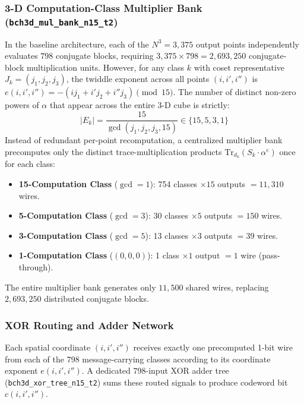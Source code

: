 \documentclass[journal]{IEEEtran}
\begin{document}
\subsubsection{3-D Computation-Class Multiplier Bank (\texttt{bch3d\_mul\_bank\_n15\_t2})}
In the baseline architecture, each of the $N^3 = 3,375$ output points independently evaluates $798$ conjugate blocks, requiring $3,375 \times 798 = 2,693,250$ conjugate-block multiplication units. However, for any class $k$ with coset representative $J_k = (j_1, j_2, j_3)$, the twiddle exponent across all points $(i, i', i'')$ is $e(i, i', i'') = -(i j_1 + i' j_2 + i'' j_3) \pmod{15}$. The number of distinct non-zero powers of $\alpha$ that appear across the entire 3-D cube is strictly:
\begin{equation}
|E_k| = \frac{15}{\gcd(j_1, j_2, j_3, 15)} \in \{15, 5, 3, 1\}
\end{equation}
Instead of redundant per-point recomputation, a centralized multiplier bank precomputes only the distinct trace-multiplication products $\mathrm{Tr}_{d_k}(S_k \cdot \alpha^e)$ once for each class:
\begin{itemize}
    \item \textbf{15-Computation Class} ($\gcd=1$): 754 classes $\times 15$ outputs $= 11,310$ wires.
    \item \textbf{5-Computation Class} ($\gcd=3$): 30 classes $\times 5$ outputs $= 150$ wires.
    \item \textbf{3-Computation Class} ($\gcd=5$): 13 classes $\times 3$ outputs $= 39$ wires.
    \item \textbf{1-Computation Class} ($(0,0,0)$): 1 class $\times 1$ output $= 1$ wire (pass-through).
\end{itemize}
The entire multiplier bank generates only $11,500$ shared wires, replacing $2,693,250$ distributed conjugate blocks.

\subsubsection{XOR Routing and Adder Network}
Each spatial coordinate $(i, i', i'')$ receives exactly one precomputed 1-bit wire from each of the 798 message-carrying classes according to its coordinate exponent $e(i, i', i'')$. A dedicated 798-input XOR adder tree (\texttt{bch3d\_xor\_tree\_n15\_t2}) sums these routed signals to produce codeword bit $c(i, i', i'')$.
\end{document}
